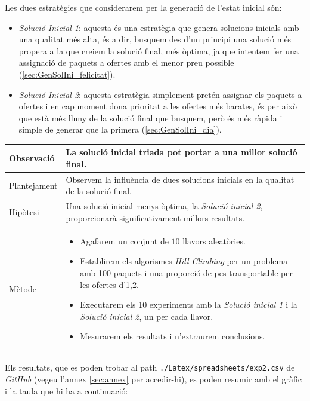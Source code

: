 \documentclass[a4paper]{article}
\begin{document}
	Les dues estratègies que considerarem per la generació de l'estat inicial són:
	
	\begin{itemize}
		\item \emph{Solució Inicial 1}: aquesta és una estratègia que genera solucions inicials amb una qualitat més alta, és a dir, busquem des d'un principi una solució més propera a la que creiem la solució final, més òptima, ja que intentem fer una assignació de paquets a ofertes amb el menor preu possible (\ref{sec:GenSolIni_felicitat}).
		
		\item \emph{Solució Inicial 2}: aquesta estratègia simplement pretén assignar els paquets a ofertes i en cap moment dona prioritat a les ofertes més barates, és per això que està més lluny de la solució final que busquem, però és més ràpida i simple de generar que la primera (\ref{sec:GenSolIni_dia}).
	\end{itemize}
	
	\begin{table}[ht]
		\centering
		\begin{tabular}{|l|p{10cm}|}
			\hline
			Observació & La solució inicial triada pot portar a una millor solució final. \\
			\hline
			Plantejament & Observem la influència de dues solucions inicials en la qualitat de la solució final. \\
			\hline
			Hipòtesi & Una solució inicial menys òptima, la \textit{Solució inicial 2}, proporcionarà significativament millors resultats.\\
			\hline
			Mètode & 
			\begin{itemize}
				\item Agafarem un conjunt de $10$ llavors aleatòries.
				\item Establirem els algorismes \textit{Hill Climbing} per un problema amb 100 paquets i una proporció de pes transportable per les ofertes d'1,2.
				\item Executarem els 10 experiments amb la \textit{Solució inicial 1} i la \textit{Solució inicial 2}, un per cada llavor.
				\item Mesurarem els resultats i n'extraurem conclusions.
			\end{itemize} \\
			\hline
		\end{tabular}
		\label{tab:exp2_apartats}
	\end{table}
	
	Els resultats, que es poden trobar al path \texttt{./Latex/spreadsheets/exp2.csv} de \textit{GitHub} (vegeu l'annex \ref{sec:annex} per accedir-hi), es poden resumir amb el gràfic i la taula que hi ha a continuació:
	
\end{document}
